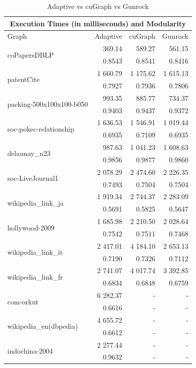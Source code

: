 \begin{table}[t!]
	\centering
	\begin{tabular}{ |l||r||r|r|}
		\hline
		\multicolumn{4}{|c|}{Execution Times (in milliseconds) and Modularity} \\
		\hline
		Graph & Adaptive & cuGraph & Gunrock \\
		\hline
		\multirow{ 2}{*}{coPapersDBLP}				& 369.14 	&  589.27  	&  561.15 \\
													& 0.8543 	&  0.8541  	&  0.8416 \\\hline
		\multirow{ 2}{*}{patentCite} 				& 1 660.79	& 1 175.62 	&  1 615.13 \\
													& 0.7927	& 0.7936   	&  0.7806 \\\hline
		\multirow{ 2}{*}{packing-500x100x100-b050}	& 993.35    & 885.77	&  734.37 \\
													& 0.9403	& 0.9437 	&  0.9372\\\hline
		\multirow{ 2}{*}{soc-pokec-relationship}	& 1 636.53	& 1 546.91 	& 1 019.44 \\ 
													& 0.6935 	& 0.7109 	& 0.6935 \\ \hline
		\multirow{ 2}{*}{delaunay\_n23 }			& 987.63 	& 1 041.23 	& 1 608.63 \\
													& 0.9856 	& 0.9877 	& 0.9860 \\\hline
		\multirow{ 2}{*}{soc-LiveJournal1}			& 2 078.29  & 2 474.60 	& 2 226.35 \\
													& 0.7493 	& 0.7504 	& 0.7504 \\\hline
		\multirow{ 2}{*}{wikipedia\_link\_ja} 		& 1 919.34  & 2 744.37 	& 2 283.09 \\
													& 0.5691	& 0.5825 	& 0.5647 \\\hline
		\multirow{ 2}{*}{hollywood-2009} 			& 1 685.98	& 2 210.50 	& 2 028.64 \\
													& 0.7542 	& 0.7511 	& 0.7468 \\\hline
		\multirow{ 2}{*}{wikipedia\_link\_it} 		& 2 417.01	& 4 184.10 	& 2 653.13 \\
													& 0.7190	& 0.7326 	& 0.7112 \\\hline
		\multirow{ 2}{*}{wikipedia\_link\_fr} 		& 2 741.07 	& 4 017.74	& 3 392.85 \\
													& 0.6834	& 0.6848	& 0.6759  \\\hline
		\multirow{ 2}{*}{com-orkut }				& 6 282.37	& -		 	& - \\
													& 0.6616	& - 		& - \\\hline
		\multirow{ 2}{*}{wikipedia\_en(dbpedia)}	& 4 655.72	& -			& - \\
													& 0.6612 	& - 		& - \\\hline
		\multirow{ 2}{*}{indochina-2004}			& 2 277.44 	& - 		& - \\
													& 0.9632	& - 		& - \\\hline
	\end{tabular}
	\caption{\label{tab:ad-cu-gun} Adaptive vs cuGraph vs Gunrock}
\end{table} 
